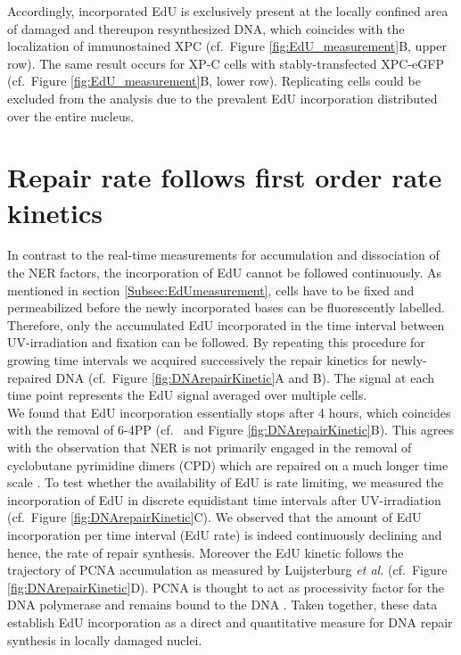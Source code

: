 \noindent Accordingly, incorporated EdU is exclusively present at the locally confined area of damaged and thereupon resynthesized DNA, which coincides with the localization of immunostained XPC (cf.\ Figure \ref{fig:EdU_measurement}B, upper row). The same result occurs for XP-C cells with stably-transfected XPC-eGFP (cf.\ Figure \ref{fig:EdU_measurement}B, lower row). Replicating cells could be excluded from the analysis due to the prevalent EdU incorporation distributed over the entire nucleus. 
  

    
 





\section{Repair rate follows first order rate kinetics}
\label{firstOrderRateKinetic}
In contrast to the real-time measurements for accumulation and dissociation of the NER factors, the incorporation of EdU cannot be followed continuously. As mentioned in section \ref{Subsec:EdUmeasurement}, cells have to be fixed and permeabilized before the newly incorporated bases can be fluorescently labelled. Therefore, only the accumulated EdU incorporated in the time interval between UV-irradiation and fixation can be followed. By repeating this procedure for growing time intervals we acquired successively the repair kinetics for newly-repaired DNA (cf.\ Figure \ref{fig:DNArepairKinetic}A and B). The signal at each time point represents the EdU signal averaged over multiple cells. \\
We found that EdU incorporation essentially stops after 4 hours, which coincides with the removal of 6-4PP (cf.\ \cite{Luijsterburg2010} and Figure \ref{fig:DNArepairKinetic}B). This agrees with the observation that NER is not primarily engaged in the removal of cyclobutane pyrimidine dimers (CPD) which are repaired on a much longer time scale \cite{Luijsterburg2010}. To test whether the availability of EdU is rate limiting, we measured the incorporation of EdU in discrete equidistant time intervals after UV-irradiation (cf.\ Figure \ref{fig:DNArepairKinetic}C). We observed that the amount of EdU incorporation per time interval (EdU rate) is indeed continuously declining and hence, the rate of repair synthesis. Moreover the EdU kinetic follows the trajectory of PCNA accumulation as measured by Luijsterburg \textit{et al.} \cite{Luijsterburg2010} (cf.\ Figure \ref{fig:DNArepairKinetic}D). PCNA is thought to act as processivity factor for the DNA polymerase and remains bound to the DNA \cite{Luijsterburg2010,Essers2005,Sporbert2002}. Taken together, these data establish EdU incorporation as a direct and quantitative measure for DNA repair synthesis in locally damaged nuclei.\\
